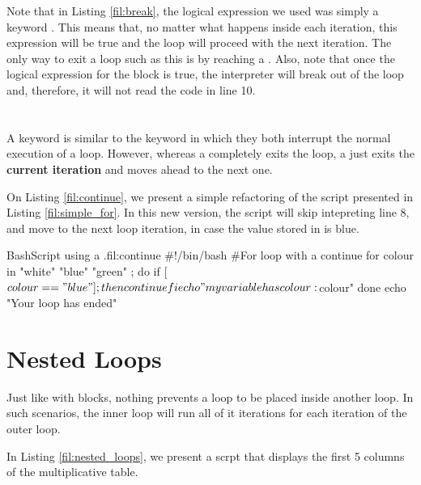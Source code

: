 Note that in Listing \ref{fil:break}, the logical expression we used was simply a keyword . This means that, no matter what happens inside each iteration, this expression will be true and the loop will proceed with the next iteration. The only way to exit a loop such as this is by reaching a . Also, note that once the logical expression for the  block is true, the interpreter will break out of the loop and, therefore, it will not read the code in line 10.

\section{}
A  keyword is similar to the  keyword in which they both interrupt the normal execution of a loop. However, whereas a  completely exits the loop, a  just exits the \textbf{current iteration} and moves ahead to the next one.

On Listing \ref{fil:continue}, we present a simple refactoring of the script presented in Listing \ref{fil:simple_for}. In this new version, the script will skip intepreting line 8, and move to the next loop iteration, in case the value stored in  is blue. 

\begin{source_code_float}{Bash}{Script using a .}{fil:continue}
#!/bin/bash
#For loop with a continue
for colour in "white" "blue" "green" ; do
    if [ $colour == "blue" ] ; then
        continue
    fi
    echo "my variable has colour: $colour"
done
echo "Your loop has ended"
\end{source_code_float}

\section{Nested Loops}

Just like with  blocks, nothing prevents a loop to be placed inside another loop. In such scenarios, the inner loop will run all of it iterations for each iteration of the outer loop.

In Listing \ref{fil:nested_loops}, we present a scrpt that displays the first 5 columns of the multiplicative table.

